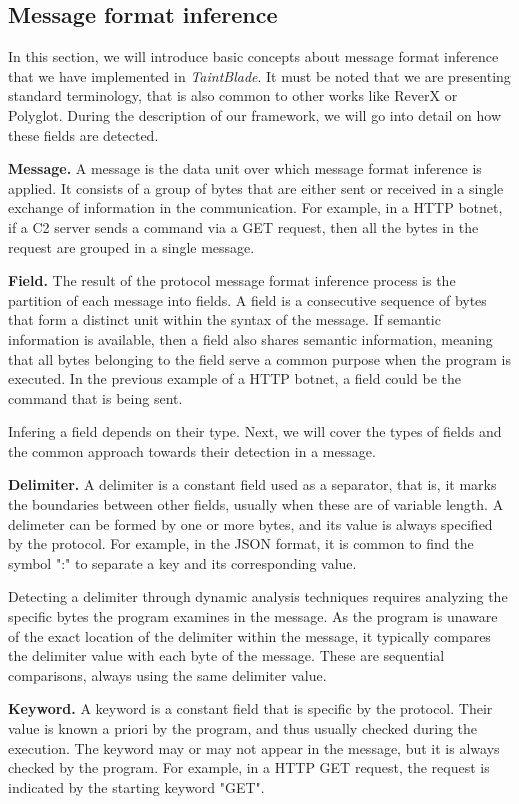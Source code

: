 \documentclass[conference]{IEEEtran}
\begin{document}
\subsection{Message format inference}
In this section, we will introduce basic concepts about message format
inference that we have implemented in \textit{TaintBlade}. It must be noted
that we are presenting standard terminology, that is also common to other works
like ReverX\cite{github_pre_reverx} or Polyglot\cite{polyglot_caballero}.
During the description of our framework, we will go into detail on how these
fields are detected.

\textbf{Message.} A message is the data unit over which message format inference is applied. It
consists of a group of bytes that are either sent or received in a single exchange of information
in the communication. For example, in a HTTP botnet, if a C2 server sends a command via a GET request,
then all the bytes in the request are grouped in a single message.

\textbf{Field.} The result of the protocol message format inference process is the partition of each
message into fields. A field is a consecutive sequence of bytes that form a distinct unit within the syntax of the message.
If semantic information is available, then a field also shares semantic information, meaning that all bytes
belonging to the field serve a common purpose when the program is executed. In the previous example of a HTTP botnet,
a field could be the command that is being sent.

Infering a field depends on their type. Next, we will cover the types of fields
and the common approach towards their detection in a message.

\textbf{Delimiter.} A delimiter is a constant field used as a separator,
that is, it marks the boundaries between other fields, usually when these
are of variable length. A delimeter can be formed by one or more bytes,
and its value is always specified by the protocol.
For example, in the JSON format, it is common to find the symbol ":" to
separate a key and its corresponding value.

Detecting a delimiter through dynamic analysis techniques requires analyzing
the specific bytes the program examines in the message. As the program is
unaware of the exact location of the delimiter within the message, it typically
compares the delimiter value with each byte of the message. These are
sequential comparisons, always using the same delimiter value.

\textbf{Keyword.} A keyword is a constant field that is specific by the protocol.
Their value is known a priori by the program, and thus usually checked during the execution.
The keyword may or may not appear in the message, but it is always checked by the program.
For example, in a HTTP GET request, the request is indicated by the starting keyword "GET".
\end{document}
